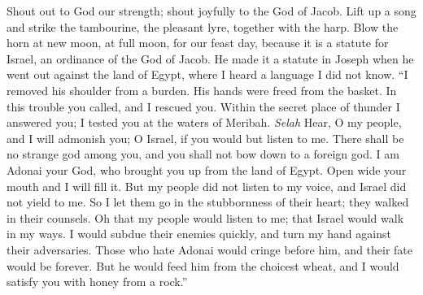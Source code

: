 \begin{biblechapter} %
 Shout out to God our strength; 
shout joyfully to the God of Jacob.
\verse Lift up a song and strike the tambourine, 
the pleasant lyre, together with the harp.
\verse Blow the horn at new moon, 
at full moon, for our feast day,
\verse because it is a statute for Israel, 
an ordinance of the God of Jacob.
\verse He made it a statute in Joseph 
when he went out against the land of Egypt, 
where I heard a language I did not know.
\verse “I removed his shoulder from a burden. 
His hands were freed from the basket.
\verse In this trouble you called, and I rescued you. 
Within the secret place of thunder I answered you; 
I tested you at the waters of Meribah. \textit{Selah}
\verse Hear, O my people, and I will admonish you; 
O Israel, if you would but listen to me.
\verse There shall be no strange god among you, 
and you shall not bow down to a foreign god.
\verse I am Adonai your God, 
who brought you up from the land of Egypt. 
Open wide your mouth and I will fill it.
\verse But my people did not listen to my voice, 
and Israel did not yield to me.
\verse So I let them go in the stubbornness of their heart; 
they walked in their counsels.
\verse Oh that my people would listen to me; 
that Israel would walk in my ways.
\verse I would subdue their enemies quickly, 
and turn my hand against their adversaries.
\verse Those who hate Adonai would cringe before him, 
and their fate would be forever.
\verse But he would feed him from the choicest wheat, 
and I would satisfy you with honey from a rock.”
\end{biblechapter}

